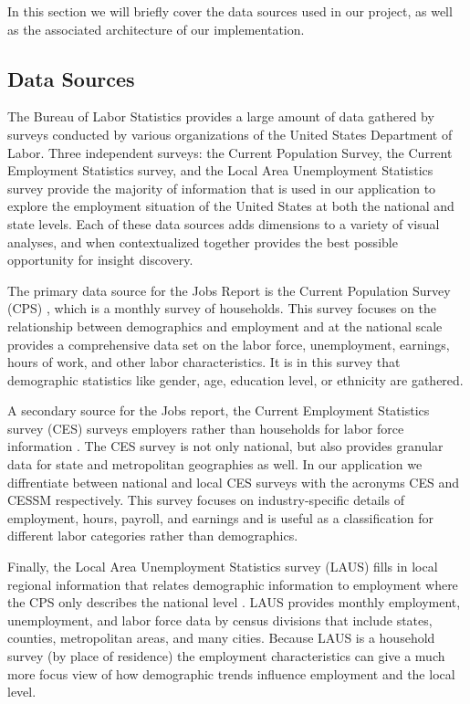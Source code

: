 \documentclass{sigchi}
\begin{document}
{In this section we will briefly cover the data sources used in our project, as well as the associated architecture of our implementation.

\subsection{Data Sources}

The Bureau of Labor Statistics provides a large amount of data gathered by surveys conducted by various organizations of the United States Department of Labor. Three independent surveys: the Current Population Survey, the Current Employment Statistics survey, and the Local Area Unemployment Statistics survey provide the majority of information that is used in our application to explore the employment situation of the United States at both the national and state levels. Each of these data sources adds dimensions to a variety of visual analyses, and when contextualized together provides the best possible opportunity for insight discovery.

The primary data source for the Jobs Report is the Current Population Survey (CPS) \cite{_labor_????}, which is a monthly survey of households. This survey focuses on the relationship between demographics and employment and at the national scale provides a comprehensive data set on the labor force, unemployment, earnings, hours of work, and other labor characteristics. It is in this survey that demographic statistics like gender, age, education level, or ethnicity are gathered.

A secondary source for the Jobs report, the Current Employment Statistics survey (CES) surveys employers rather than households for labor force information \cite{_current_2015}. The CES survey is not only national, but also provides granular data for state and metropolitan geographies as well. In our application we diffrentiate between national and local CES surveys with the acronyms CES and CESSM respectively. This survey focuses on industry-specific details of employment, hours, payroll, and earnings and is useful as a classification for different labor categories rather than demographics.

Finally, the Local Area Unemployment Statistics survey (LAUS) fills in local regional information that relates demographic information to employment where the CPS only describes the national level \cite{_local_2015}. LAUS provides monthly employment, unemployment, and labor force data by census divisions that include states, counties, metropolitan areas, and many cities. Because LAUS is a household survey (by place of residence) the employment characteristics can give a much more focus view of how demographic trends influence employment and the local level.

}
\end{document}
